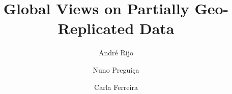 \documentclass[sigconf, nonacm]{acmart}
\begin{document}

\title{Global Views on Partially Geo-Replicated Data}

%



\author{André Rijo}
\author{Nuno Preguiça}
\author{Carla Ferreira}
\end{document}
